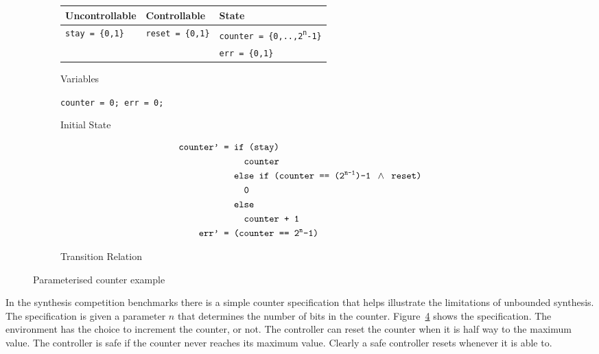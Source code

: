 \begin{figure}
    \begin{subfigure}[t]{\textwidth}
        \centering
        \begin{tabular}{l | l | l}
            \textbf{Uncontrollable} & \textbf{Controllable} & \textbf{State} \\
            \hline
            \texttt{stay = \{0,1\}} & \texttt{reset = \{0,1\}} & \texttt{counter = \{0,..,2\textsuperscript{n}-1\}} \\
                                    & & \texttt{err = \{0,1\}}
        \end{tabular}
        \caption{Variables}
        \label{fig:examplevars}
    \end{subfigure}

    \vspace{5mm}
    \begin{subfigure}[t]{\textwidth}
        \centering
        \texttt{counter = 0; err = 0;}
        \caption{Initial State}
        \label{fig:exampleinit}
    \end{subfigure}

    \begin{subfigure}[t]{\textwidth}
        \begin {align*}
        \texttt{counter' = }{}& \texttt{if (stay)} \\
        {}& \texttt{\ \ counter} \\
        {}& \texttt{else if (counter == (2\textsuperscript{n-1})-1 } \land \texttt{ reset)} \\
        {}& \texttt{\ \ 0} \\
        {}& \texttt{else} \\
        {}& \texttt{\ \ counter + 1} \\
        \texttt{err' = }{}& \texttt{(counter == 2\textsuperscript{n}-1)}
        \end{align*}
        \caption{Transition Relation}
        \label{fig:exampletrans}
    \end{subfigure}
    \caption{Parameterised counter example}
    \label{fig:counter}
\end{figure}

In the synthesis competition benchmarks there is a simple counter specification that helps illustrate the limitations of unbounded synthesis. The specification is given a parameter $n$ that determines the number of bits in the counter. Figure~\ref{fig:counter} shows the specification. The environment has the choice to increment the counter, or not. The controller can reset the counter when it is half way to the maximum value. The controller is safe if the counter never reaches its maximum value. Clearly a safe controller resets whenever it is able to.

